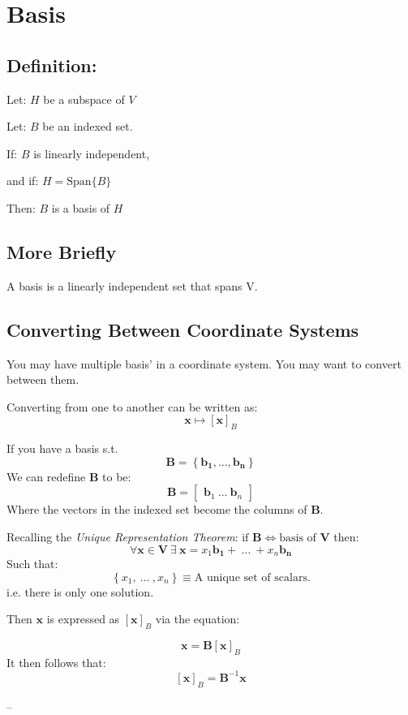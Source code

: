 \documentclass{article}
\begin{document}
\clearpage 

\section{Basis} 

\subsection{Definition:} 
Let: $ H $ be a subspace of $ V $

Let: $ B $ be an indexed set.

If: $ B $ is linearly independent,

and if: $ H = \text{Span} \{ B \}$

Then: $ B $ is a basis of $ H $

\subsection{More Briefly} 
A basis is a linearly independent set that spans V.

\subsection{Converting Between Coordinate Systems} 
You may have multiple basis' in a coordinate system. You may want to convert
between them.

Converting from one to another can be written as: 
\[%
    \mathbf{x} \mapsto \left[ \mathbf{x} \right]_{B} 
\]%

If you have a basis s.t.
\[%
    \mathbf{B} = \left\{ \mathbf{b_1}, \ldots , \mathbf{b_{n}}  \right\}
\]%
We can redefine $ \mathbf{B} $ to be:
\[%
    \mathbf{B} = 
    \begin{bmatrix}
        \mathbf{b}_{1} \ \ldots \ \mathbf{b}_{n}
    \end{bmatrix}
\]%
Where the vectors in the indexed set become the columns of $ \mathbf{B} $.

Recalling the \textit{Unique Representation Theorem}:
$ \text{if } \mathbf{B} \iff \text{basis of } \mathbf{V} $ then:
\[%
    \forall \mathbf{x} \in \mathbf{V} \ \exists \ \mathbf{x}= x_1 \mathbf{b_1}
    +  \ \ldots \ + x_{n} \mathbf{b_{n} }
\]%
Such that:
\[%
    \left\{ x_1, \ \ldots \ , x_{n} \right\} \equiv \text{A unique set of
    scalars.} 
\]%
i.e. there is only one solution.
\vspace{1cm}

Then $ \mathbf{x} $ is expressed as $ \left[ \mathbf{x} \right]_{B}  $ via the
equation:

\[%
    \mathbf{x} =  \mathbf{B}\left[ \mathbf{x} \right]_{B}
\]%
It then follows that:
\[%
    \left[ \mathbf{x} \right]_{B} = \mathbf{B}^{-1}\mathbf{x}
\]%
































\clearpage
--
\end{document}
